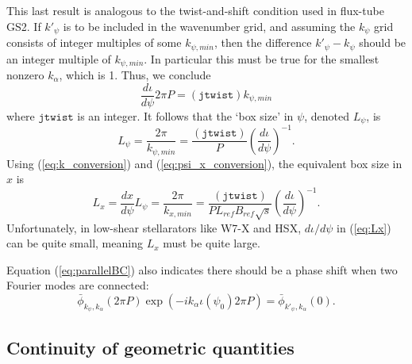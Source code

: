 \documentclass[11pt,letter]{article}
\newcommand{\jtwist}{\mathtt{jtwist}}
\begin{document}
This last result is analogous to the twist-and-shift condition used in flux-tube GS2. 
If $k'_\psi$ is to be included in the wavenumber grid, and assuming the $k_\psi$ grid consists of integer multiples of some
$k_{\psi,min}$, then the difference $k'_\psi - k_\psi$ should
be an integer multiple of $k_{\psi,min}$. 
In particular this must be true for the smallest nonzero $k_\alpha$, which is 1.
Thus, we conclude
\begin{equation}
\frac{d\iota}{d\psi} 2\pi P = (\jtwist) k_{\psi,min}
\end{equation}
where $\jtwist$ is an integer. It follows that the `box size' in $\psi$, denoted $L_\psi$, is
\begin{equation}
L_\psi = \frac{2\pi}{k_{\psi,min}} = 
\frac{(\jtwist)}{P} \left( \frac{d\iota}{d\psi} \right)^{-1}.
\end{equation}
Using (\ref{eq:k_conversion}) and (\ref{eq:psi_x_conversion}), the equivalent box size in $x$ is
\begin{equation}
L_x = \frac{dx}{d\psi} L_\psi = \frac{2\pi}{k_{x,min}} = 
\frac{(\jtwist)}{ P L_{ref} B_{ref} \sqrt{s}} \left( \frac{d\iota}{d\psi} \right)^{-1}.
\label{eq:Lx}
\end{equation}
Unfortunately, in low-shear stellarators like W7-X and HSX, $d \iota/d\psi$ in 
(\ref{eq:Lx}) can be quite small, meaning $L_x$ must be quite large.

Equation (\ref{eq:parallelBC}) also indicates there should be a phase shift when two Fourier modes
are connected:
\begin{equation}
\bar{\phi}_{k_\psi,k_\alpha}(2\pi P) \exp
\left( -i k_\alpha \iota(\psi_0) 2\pi P \right) 
=
\bar{\phi}_{k'_\psi,k_\alpha}(0).
\label{eq:phase}
\end{equation}

\subsection{Continuity of geometric quantities}
\end{document}
